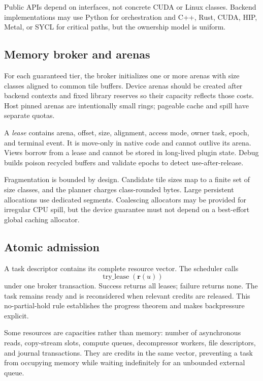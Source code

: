 Public APIs depend on interfaces, not concrete CUDA or Linux classes. Backend implementations may use Python for orchestration and C++, Rust, CUDA, HIP, Metal, or SYCL for critical paths, but the ownership model is uniform.

\subsection{Memory broker and arenas}

For each guaranteed tier, the broker initializes one or more arenas with size classes aligned to common tile buffers. Device arenas should be created after backend contexts and fixed library reserves so their capacity reflects those costs. Host pinned arenas are intentionally small rings; pageable cache and spill have separate quotas.

A \emph{lease} contains arena, offset, size, alignment, access mode, owner task, epoch, and terminal event. It is move-only in native code and cannot outlive its arena. Views borrow from a lease and cannot be stored in long-lived plugin state. Debug builds poison recycled buffers and validate epochs to detect use-after-release.

Fragmentation is bounded by design. Candidate tile sizes map to a finite set of size classes, and the planner charges class-rounded bytes. Large persistent allocations use dedicated segments. Coalescing allocators may be provided for irregular CPU spill, but the device guarantee must not depend on a best-effort global caching allocator.

\subsection{Atomic admission}

A task descriptor contains its complete resource vector. The scheduler calls
\[
  \operatorname{try\_lease}(\mathbf r(u))
\]
under one broker transaction. Success returns all leases; failure returns none. The task remains ready and is reconsidered when relevant credits are released. This no-partial-hold rule establishes the progress theorem and makes backpressure explicit.

Some resources are capacities rather than memory: number of asynchronous reads, copy-stream slots, compute queues, decompressor workers, file descriptors, and journal transactions. They are credits in the same vector, preventing a task from occupying memory while waiting indefinitely for an unbounded external queue.

